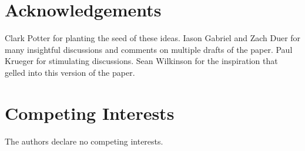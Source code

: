 \documentclass[12pt]{article}
\begin{document}





\section*{Acknowledgements} 

Clark Potter for planting the seed of these ideas. Iason Gabriel and Zach Duer for many insightful discussions and comments on multiple drafts of the paper. Paul Krueger for stimulating discussions. Sean Wilkinson for the inspiration that gelled into this version of the paper.

\section*{Competing Interests}

The authors declare no competing interests.


\end{document}
